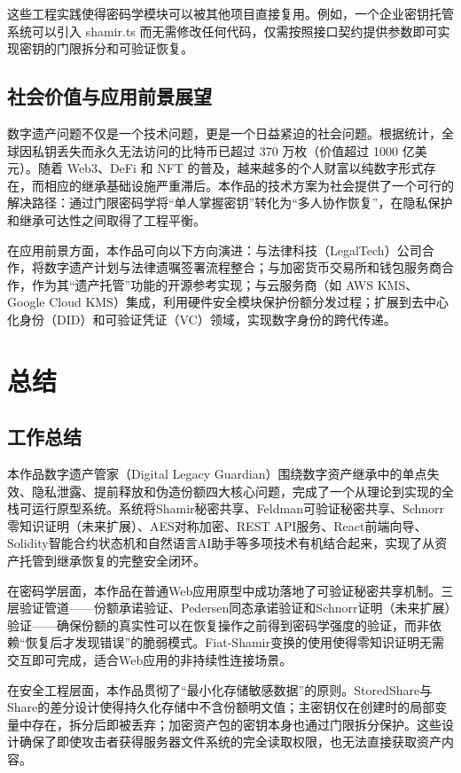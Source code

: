 \documentclass[UTF8,a4paper,zihao=-4,openany]{ctexrep}
\newcommand{\project}{数字遗产管家}
\newcommand{\englishname}{Digital Legacy Guardian}
\begin{document}
这些工程实践使得密码学模块可以被其他项目直接复用。例如，一个企业密钥托管系统可以引入 shamir.ts 而无需修改任何代码，仅需按照接口契约提供参数即可实现密钥的门限拆分和可验证恢复。

\section{社会价值与应用前景展望}

数字遗产问题不仅是一个技术问题，更是一个日益紧迫的社会问题。根据统计，全球因私钥丢失而永久无法访问的比特币已超过 370 万枚（价值超过 1000 亿美元）。随着 Web3、DeFi 和 NFT 的普及，越来越多的个人财富以纯数字形式存在，而相应的继承基础设施严重滞后。本作品的技术方案为社会提供了一个可行的解决路径：通过门限密码学将“单人掌握密钥”转化为“多人协作恢复”，在隐私保护和继承可达性之间取得了工程平衡。

在应用前景方面，本作品可向以下方向演进：与法律科技（LegalTech）公司合作，将数字遗产计划与法律遗嘱签署流程整合；与加密货币交易所和钱包服务商合作，作为其“遗产托管”功能的开源参考实现；与云服务商（如 AWS KMS、Google Cloud KMS）集成，利用硬件安全模块保护份额分发过程；扩展到去中心化身份（DID）和可验证凭证（VC）领域，实现数字身份的跨代传递。

\chapter{总结}

\section{工作总结}

本作品\project（\englishname）围绕数字资产继承中的单点失效、隐私泄露、提前释放和伪造份额四大核心问题，完成了一个从理论到实现的全栈可运行原型系统。系统将Shamir秘密共享、Feldman可验证秘密共享、Schnorr零知识证明（未来扩展）、AES对称加密、REST API服务、React前端向导、Solidity智能合约状态机和自然语言AI助手等多项技术有机结合起来，实现了从资产托管到继承恢复的完整安全闭环。

在密码学层面，本作品在普通Web应用原型中成功落地了可验证秘密共享机制。三层验证管道——份额承诺验证、Pedersen同态承诺验证和Schnorr证明（未来扩展）验证——确保份额的真实性可以在恢复操作之前得到密码学强度的验证，而非依赖“恢复后才发现错误”的脆弱模式。Fiat-Shamir变换的使用使得零知识证明无需交互即可完成，适合Web应用的非持续性连接场景。

在安全工程层面，本作品贯彻了“最小化存储敏感数据”的原则。StoredShare与Share的差分设计使得持久化存储中不含份额明文值；主密钥仅在创建时的局部变量中存在，拆分后即被丢弃；加密资产包的密钥本身也通过门限拆分保护。这些设计确保了即使攻击者获得服务器文件系统的完全读取权限，也无法直接获取资产内容。
\end{document}

